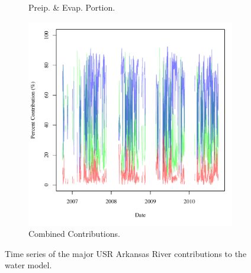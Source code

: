 \begin{linenumbers}
\begin{figure}[htbp]
\begin{subfigure}{0.5\textwidth}
		\caption{Preip. \& Evap. Portion.}
	\end{subfigure}%
	\begin{subfigure}{0.5\textwidth}
		\centering
		\includegraphics[width=\tableCustomSize]{"Figures/Results_USR/Stochastic/M Water Contrib 4"}
		\caption{Combined Contributions.}
	\end{subfigure}
	\caption[Time series of the major USR Arkansas River contributions to the water model.]{Time series of the major USR Arkansas River contributions to the water model.}
	\label{fig:USRWaterContrib}
\end{figure}


\end{linenumbers}

